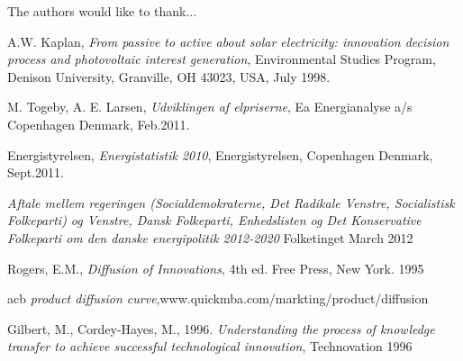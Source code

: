 \documentclass[conference]{IEEEtran}
\begin{document}
The authors would like to thank...







%
%
%

\begin{thebibliography}{1}

A.W. Kaplan, \emph{From passive to active about solar electricity: innovation decision
process and photovoltaic interest generation}, \relax Environmental Studies Program, Denison University, Granville, OH 43023, USA, July 1998.

M. Togeby, A. E. Larsen, \emph{Udviklingen af elpriserne}, \relax Ea Energianalyse a/s Copenhagen Denmark, Feb.2011.

Energistyrelsen, \emph{Energistatistik 2010}, \relax Energistyrelsen, Copenhagen Denmark, Sept.2011.

\emph{Aftale mellem regeringen (Socialdemokraterne, Det Radikale Venstre, Socialistisk Folkeparti) og Venstre, Dansk Folkeparti, Enhedslisten og Det Konservative Folkeparti
om den danske energipolitik 2012-2020} \relax Folketinget March 2012

Rogers, E.M., \emph{Diffusion of Innovations}, \relax 4th ed. Free Press, New York. 1995

acb \emph{product diffusion curve},\relax www.quickmba.com/markting/product/diffusion

Gilbert, M., Cordey-Hayes, M., 1996. \emph{Understanding the process of
knowledge transfer to achieve successful technological innovation}, \relax Technovation 1996

\end{thebibliography}




\end{document}
